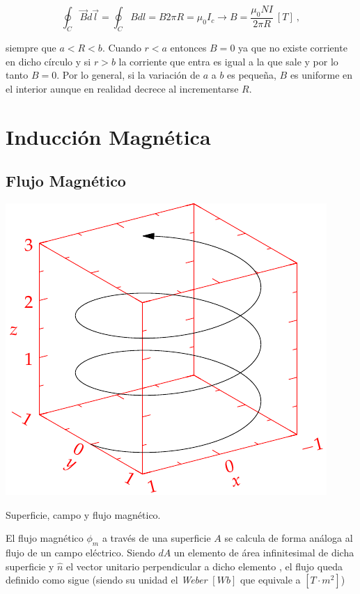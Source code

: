 \documentclass{tufte-handout}
\begin{document}
\begin{equation}
\oint_C \vec{B}d\vec{l} = \oint_C B dl = B2\pi R = \mu_0 I_c \rightarrow B = \frac{\mu_0 NI}{2\pi R}~[T]~,
\end{equation}

siempre que $a < R < b$. Cuando $r < a$ entonces $B = 0$ ya que no existe corriente en dicho círculo y si $r > b$ la corriente que entra es igual a la que sale y por lo tanto $B = 0$. Por lo general, si la variación de $a$ a $b$ es pequeña, $B$ es uniforme en el interior aunque en realidad decrece al incrementarse $R$.

\clearpage

\section{Inducción Magnética}

\subsection{Flujo Magnético}

\begin{marginfigure}%
    \includegraphics[width=\linewidth]{helix}
    \caption{Superficie, campo y flujo magnético.}
    \label{fig:flujomagnetico}
\end{marginfigure}

El flujo magnético $\phi_m$ a través de una superficie $A$ se calcula de forma análoga al flujo de un campo eléctrico. Siendo $dA$ un elemento de área infinitesimal de dicha superficie y $\hat{n}$ el vector unitario perpendicular a dicho elemento , el flujo queda definido como sigue (siendo su unidad el \emph{Weber} $[Wb]$ que equivale a $[T\cdot m^2]$)
\end{document}
